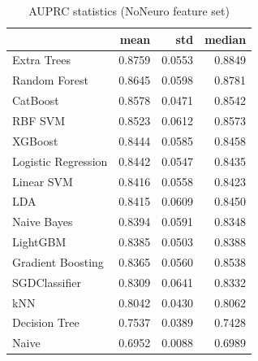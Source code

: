 \begin{table}
\caption{AUPRC statistics (NoNeuro feature set)}
\label{tab:auprc_NoNeuro_stats}
\begin{tabular}{lrrr}
\toprule
 & mean & std & median \\
\midrule
Extra Trees & 0.8759 & 0.0553 & 0.8849 \\
Random Forest & 0.8645 & 0.0598 & 0.8781 \\
CatBoost & 0.8578 & 0.0471 & 0.8542 \\
RBF SVM & 0.8523 & 0.0612 & 0.8573 \\
XGBoost & 0.8444 & 0.0585 & 0.8458 \\
Logistic Regression & 0.8442 & 0.0547 & 0.8435 \\
Linear SVM & 0.8416 & 0.0558 & 0.8423 \\
LDA & 0.8415 & 0.0609 & 0.8450 \\
Naive Bayes & 0.8394 & 0.0591 & 0.8348 \\
LightGBM & 0.8385 & 0.0503 & 0.8388 \\
Gradient Boosting & 0.8365 & 0.0560 & 0.8538 \\
SGDClassifier & 0.8309 & 0.0641 & 0.8332 \\
kNN & 0.8042 & 0.0430 & 0.8062 \\
Decision Tree & 0.7537 & 0.0389 & 0.7428 \\
Naive & 0.6952 & 0.0088 & 0.6989 \\
\bottomrule
\end{tabular}
\end{table}

